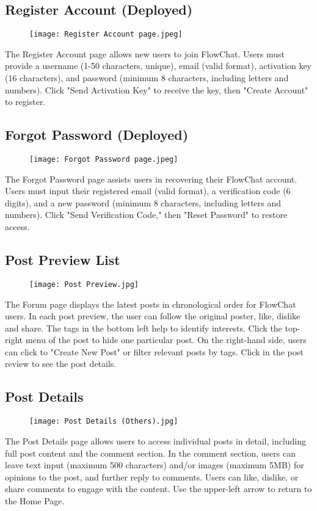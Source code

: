 \documentclass[11pt, a4paper]{article}
\begin{document}
\subsection{Register Account (Deployed)}
\begin{figure}[H]
    \centering
    \texttt{[image: Register Account page.jpeg]}
    \label{fig:Register-Account Component Layout}
\end{figure}
The Register Account page allows new users to join FlowChat. Users must provide a username (1-50 characters, unique), email (valid format), activation key (16 characters), and password (minimum 8 characters, including letters and numbers). Click "Send Activation Key" to receive the key, then "Create Account" to register.

\subsection{Forgot Password (Deployed)}
\begin{figure}[H]
    \centering
    \texttt{[image: Forgot Password page.jpeg]}
    \label{fig:Forgot-Password Component Layout}
\end{figure}
The Forgot Password page assists users in recovering their FlowChat account. Users must input their registered email (valid format), a verification code (6 digits), and a new password (minimum 8 characters, including letters and numbers). Click "Send Verification Code," then "Reset Password" to restore access.

\subsection{Post Preview List}
\begin{figure}[H]
    \centering
    \texttt{[image: Post Preview.jpg]}
    \label{fig:Home_Page}
\end{figure}
The Forum page displays the latest posts in chronological order for FlowChat users. In each post preview, the user can follow the original poster, like, dislike and share. The tags in the bottom left help to identify interests. Click the top-right menu of the post to hide one particular post. On the right-hand side, users can click to "Create New Post" or filter relevant posts by tags. Click in the post review to see the post details.

\subsection{Post Details}
\begin{figure}[H]
    \centering
    \texttt{[image: Post Details (Others).jpg]}
    \label{fig:View_Others_Post_Page}
\end{figure}
The Post Details page allows users to access individual posts in detail, including full post content and the comment section. In the comment section, users can leave text input (maximum 500 characters) and/or images (maximum 5MB) for opinions to the post, and further reply to comments. Users can like, dislike, or share comments to engage with the content. Use the upper-left arrow to return to the Home Page. 
\end{document}
